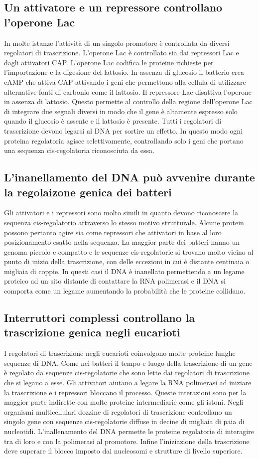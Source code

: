 \subsection{Un attivatore e un repressore controllano l'operone Lac}
In molte istanze l'attivit\`a di un singolo promotore \`e controllata da diversi regolatori di trascrizione. L'operone Lac \`e controllato sia dai repressori Lac e dagli attivatori CAP. 
L'operone Lac codifica le proteine richieste per l'importazione e la digesione del lattosio. In assenza di glucosio il batterio crea cAMP che attiva CAP attivando i geni che permettono
alla cellula di utilizzare alternative fonti di carbonio come il lattosio. Il repressore Lac disattiva l'operone in assenza di lattosio. Questo permette al controllo della regione 
dell'operone Lac di integrare due segnali diversi in modo che il gene \`e altamente espresso solo quando il glucosio \`e assente e il lattosio \`e presente. Tutti i regolatori di 
trascrizione devono legarsi al DNA per sortire un effetto. In questo modo ogni proteina regolatoria agisce selettivamente, controllando solo i geni che portano una sequenza 
cis-regolatoria riconosciuta da essa.
\subsection{L'inanellamento del DNA pu\`o avvenire durante la regolaizone genica dei batteri}
Gli attivatori e i repressori sono molto simili in quanto devono riconoscere la sequenza cis-regolatorio attraverso lo stesso motivo strutturale. Alcune protein possono pertanto agire
sia come repressori che attivatori in base al loro posizionamento esatto nella sequenza. La maggior parte dei batteri hanno un genoma piccolo e compatto e le sequenze cis-regolatorie si
trovano molto vicino al punto di inizio della trascrizione, con delle eccezioni in cui \`e distante centinaia o migliaia di coppie. In questi casi il DNA \`e inanellato permettendo a un
legame proteico ad un sito distante di contattare la RNA polimerasi e il DNA si comporta come un legame aumentando la probabilit\`a che le proteine collidano. 
\subsection{Interruttori complessi controllano la trascrizione genica negli eucarioti}
I regolatori di trascrizione negli eucarioti coinvolgono molte proteine lunghe sequenze di DNA. Come nei batteri il tempo e luogo della trascrizione di un gene \`e regolato da sequenze
cis-regolatorie che sono lette dai regolatori di trascrizione che si legano a esse. Gli attivatori aiutano a legare la RNA polimerasi ad iniziare la trascrizione e i repressori bloccano
il processo. Queste interazioni sono per la maggior parte indirette con molte proteine intermediarie come gli istoni. Negli organismi multicellulari dozzine di regolatori di trascrizione
controllano un singolo gene con sequenze cis-regolatorie diffuse in decine di migliaia di paia di nucleotidi. L'inallenamento del DNA permette le proteine regolatorie di interagire tra 
di loro e con la polimerasi al promotore. Infine l'iniziazione della trascrizione deve superare il blocco imposto dai nucleosomi e strutture di livello superiore.
